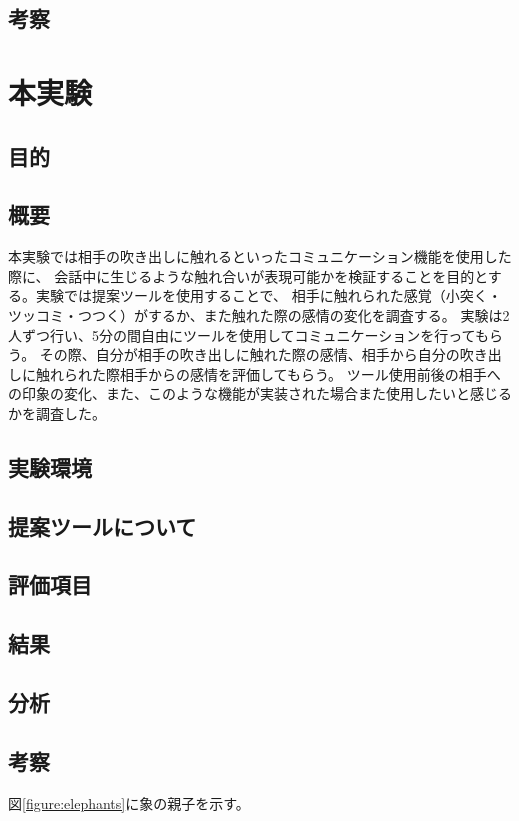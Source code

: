 \documentclass[11pt,a4paper]{ltjsreport}
\begin{document}
\subsection{考察}

\section{本実験}
\subsection{目的}
\subsection{概要}
本実験では相手の吹き出しに触れるといったコミュニケーション機能を使用した際に、
会話中に生じるような触れ合いが表現可能かを検証することを目的とする。実験では提案ツールを使用することで、
相手に触れられた感覚（小突く・ツッコミ・つつく）がするか、また触れた際の感情の変化を調査する。
実験は2人ずつ行い、5分の間自由にツールを使用してコミュニケーションを行ってもらう。
その際、自分が相手の吹き出しに触れた際の感情、相手から自分の吹き出しに触れられた際相手からの感情を評価してもらう。
ツール使用前後の相手への印象の変化、また、このような機能が実装された場合また使用したいと感じるかを調査した。

\subsection{実験環境}
\subsection{提案ツールについて}
\subsection{評価項目}
\subsection{結果}
\subsection{分析}
\subsection{考察}

図\ref{figure:elephants}に象の親子を示す。
\end{document}
